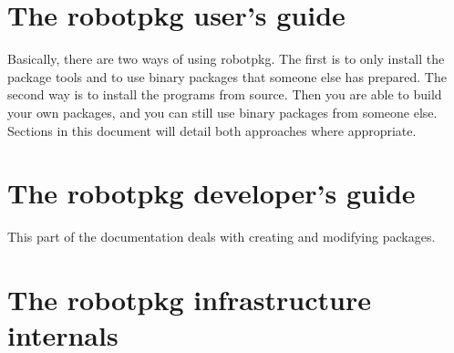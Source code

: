 \documentclass[a4paper,11pt]{book}
\begin{document}
\chapter{The robotpkg user's guide}
\label{chapter:user}

Basically, there are two ways of using robotpkg.  The  first is to only install
the  package tools and to  use binary packages that  someone else has prepared.
The second way is  to install the  programs from source. Then  you are  able to
build your own packages,  and you can  still use  binary packages from  someone
else. Sections in this document will detail both approaches where appropriate.






\chapter{The robotpkg developer's guide}
\label{chapter:developer}

This part of the documentation deals with creating and modifying packages.




\chapter{The robotpkg infrastructure internals}
\label{chapter:internal}
\end{document}
